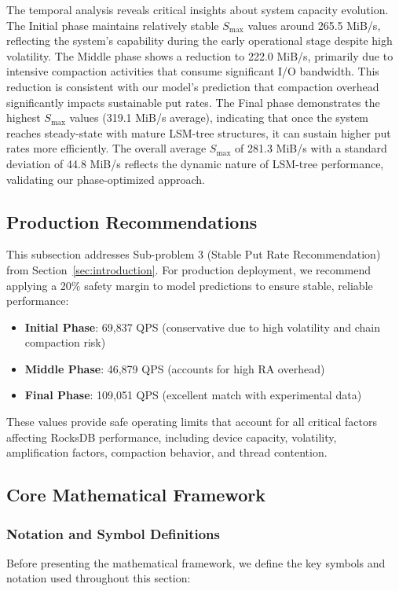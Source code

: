 \documentclass[11pt]{article}
\begin{document}
The temporal analysis reveals critical insights about system capacity evolution. The Initial phase maintains relatively stable $S_{\max}$ values around 265.5 MiB/s, reflecting the system's capability during the early operational stage despite high volatility. The Middle phase shows a reduction to 222.0 MiB/s, primarily due to intensive compaction activities that consume significant I/O bandwidth. This reduction is consistent with our model's prediction that compaction overhead significantly impacts sustainable put rates. The Final phase demonstrates the highest $S_{\max}$ values (319.1 MiB/s average), indicating that once the system reaches steady-state with mature LSM-tree structures, it can sustain higher put rates more efficiently. The overall average $S_{\max}$ of 281.3 MiB/s with a standard deviation of 44.8 MiB/s reflects the dynamic nature of LSM-tree performance, validating our phase-optimized approach.

\subsection{Production Recommendations}

This subsection addresses Sub-problem 3 (Stable Put Rate Recommendation) from Section~\ref{sec:introduction}. For production deployment, we recommend applying a 20\% safety margin to model predictions to ensure stable, reliable performance:

\begin{itemize}
    \item \textbf{Initial Phase}: 69,837 QPS (conservative due to high volatility and chain compaction risk)
    \item \textbf{Middle Phase}: 46,879 QPS (accounts for high RA overhead)
    \item \textbf{Final Phase}: 109,051 QPS (excellent match with experimental data)
\end{itemize}

These values provide safe operating limits that account for all critical factors affecting RocksDB performance, including device capacity, volatility, amplification factors, compaction behavior, and thread contention.

\subsection{Core Mathematical Framework}

\subsubsection{Notation and Symbol Definitions}
Before presenting the mathematical framework, we define the key symbols and notation used throughout this section:
\end{document}
